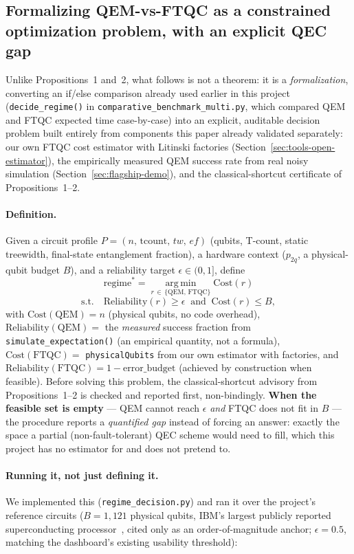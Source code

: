 \documentclass[9pt,twocolumn]{extarticle}
\begin{document}
\subsection{Formalizing QEM-vs-FTQC as a constrained optimization problem, with an explicit QEC gap}
\label{sec:decision-formal}
Unlike Propositions~1 and~2, what follows is not a theorem: it is a
\emph{formalization}, converting an if/else comparison already used
earlier in this project (\texttt{decide\_regime()} in
\texttt{comparative\_benchmark\_multi.py}, which compared QEM and FTQC
expected time case-by-case) into an explicit, auditable decision problem
built entirely from components this paper already validated separately:
our own FTQC cost estimator with Litinski factories
(Section~\ref{sec:tools-open-estimator}), the empirically measured QEM
success rate from real noisy simulation
(Section~\ref{sec:flagship-demo}), and the classical-shortcut certificate
of Propositions~1--2.

\paragraph{Definition.} Given a circuit profile $P=(n,\,\text{tcount},\,tw,\,ef)$
(qubits, T-count, static treewidth, final-state entanglement fraction), a
hardware context ($p_{2q}$, a physical-qubit budget $B$), and a
reliability target $\epsilon\in(0,1]$, define
\[
\text{regime}^\ast = \operatorname*{arg\,min}_{r\,\in\,\{\text{QEM},\,\text{FTQC}\}} \text{Cost}(r)
\]
\[
\text{s.t.}\quad \text{Reliability}(r)\geq\epsilon \ \text{ and } \ \text{Cost}(r)\leq B,
\]
with $\text{Cost}(\text{QEM})=n$ (physical qubits, no code overhead),
$\text{Reliability}(\text{QEM})=$ the \emph{measured} success fraction
from \texttt{simulate\_expectation()} (an empirical quantity, not a
formula), $\text{Cost}(\text{FTQC})=$ \texttt{physicalQubits} from our own
estimator with factories, and $\text{Reliability}(\text{FTQC})=1-\text{error\_budget}$
(achieved by construction when feasible). Before solving this problem, the
classical-shortcut advisory from Propositions~1--2 is checked and
reported first, non-bindingly. \textbf{When the feasible set is empty}
--- QEM cannot reach $\epsilon$ \emph{and} FTQC does not fit in $B$ ---
the procedure reports a \emph{quantified gap} instead of forcing an
answer: exactly the space a partial (non-fault-tolerant) QEC scheme would
need to fill, which this project has no estimator for and does not
pretend to.

\paragraph{Running it, not just defining it.} We implemented this
(\texttt{regime\_decision.py}) and ran it over the project's reference
circuits ($B=1{,}121$ physical qubits, IBM's largest publicly reported
superconducting processor~\cite{ibmcondor2023}, cited only as an
order-of-magnitude anchor; $\epsilon=0.5$, matching the dashboard's
existing usability threshold):
\end{document}
